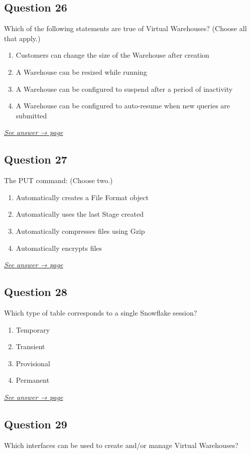 \documentclass[12pt]{article}
\newcommand{\seeanswer}[1]{%
  \par\smallskip\emph{\hyperref[ans:#1]{See answer → page \pageref{ans:#1}}}%
}
\begin{document}
\subsection*{Question 26}\label{q:26}
Which of the following statements are true of Virtual Warehouses? (Choose all that apply.)

\begin{enumerate}[label=\Alph*.]
  \item Customers can change the size of the Warehouse after creation
  \item A Warehouse can be resized while running
  \item A Warehouse can be configured to suspend after a period of inactivity
  \item A Warehouse can be configured to auto-resume when new queries are submitted
\end{enumerate}
\seeanswer{26}

\subsection*{Question 27}\label{q:27}
The PUT command: (Choose two.)

\begin{enumerate}[label=\Alph*.]
  \item Automatically creates a File Format object
  \item Automatically uses the last Stage created
  \item Automatically compresses files using Gzip
  \item Automatically encrypts files
\end{enumerate}
\seeanswer{27}

\subsection*{Question 28}\label{q:28}
Which type of table corresponds to a single Snowflake session?

\begin{enumerate}[label=\Alph*.]
  \item Temporary
  \item Transient
  \item Provisional
  \item Permanent
\end{enumerate}
\seeanswer{28}

\subsection*{Question 29}\label{q:29}
Which interfaces can be used to create and/or manage Virtual Warehouses?
\end{document}
